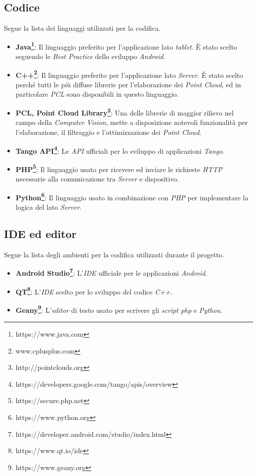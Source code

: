 \subsection{Codice}
Segue la lista dei linguaggi utilizzati per la codifica.
\begin{itemize}
	\item \textbf{Java\footnote{https://www.java.com}}: Il linguaggio preferito per l'applicazione lato \emph{tablet}. È stato scelto seguendo le \emph{Best Practice} dello sviluppo \emph{Android}.
	\item \textbf{C++\footnote{www.cplusplus.com}}: Il linguaggio preferito per l'applicazione lato \emph{Server}. È stato scelto perché tutti le più diffuse librerie per l'elaborazione dei \emph{Point Cloud}, ed in particolare \emph{PCL} sono disponibili in questo linguaggio.
	\item \textbf{PCL, Point Cloud Library\footnote{http://pointclouds.org}}: Una delle librerie di maggior rilievo nel campo della \emph{Computer Vision}, mette a disposizione notevoli funzionalità per l'elaborazione, il filtraggio e l'ottimizzazione dei \emph{Point Cloud}.
	\item \textbf{Tango API\footnote{https://developers.google.com/tango/apis/overview}}: Le \emph{API} ufficiali per lo sviluppo di applicazioni \emph{Tango}.
	\item \textbf{PHP\footnote{https://secure.php.net}}: Il linguaggio usato per ricevere ed inviare le richieste \emph{HTTP} necessarie alla comunicazione tra \emph{Server} e dispositivo.
	\item \textbf{Python\footnote{https://www.python.org}}: Il linguaggio usato in combinazione con \emph{PHP} per implementare la logica del lato \emph{Server}.
\end{itemize}

\newpage
\subsection{IDE ed editor}
Segue la lista degli ambienti per la codifica utilizzati durante il progetto.
\begin{itemize}
	\item \textbf{Android Studio\footnote{https://developer.android.com/studio/index.html}}: L'\emph{IDE} ufficiale per le applicazioni \emph{Android}.
	\item \textbf{QT\footnote{https://www.qt.io/ide}}: L'\emph{IDE} scelto per lo sviluppo del codice \emph{C++}.
	\item \textbf{Geany\footnote{https://www.geany.org}}: L'\emph{editor} di testo usato per scrivere gli \emph{script} \emph{php} e \emph{Python}.
\end{itemize}

